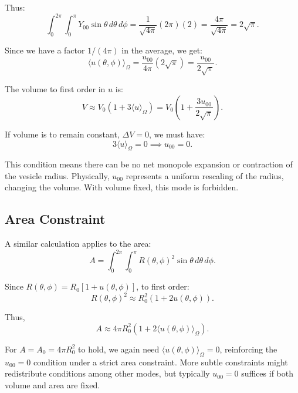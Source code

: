 \documentclass[12pt,a4paper]{article}
\begin{document}
Thus:
\begin{equation}
\int_0^{2\pi}\int_0^\pi Y_{00}\sin\theta\, d\theta\, d\phi = \frac{1}{\sqrt{4\pi}}(2\pi)(2) = \frac{4\pi}{\sqrt{4\pi}} = 2\sqrt{\pi}.
\end{equation}

Since we have a factor $1/(4\pi)$ in the average, we get:
\begin{equation}
\langle u(\theta,\phi)\rangle_{\Omega} = \frac{u_{00}}{4\pi}(2\sqrt{\pi}) = \frac{u_{00}}{2\sqrt{\pi}}.
\end{equation}

The volume to first order in $u$ is:
\begin{equation}
V \approx V_0(1 + 3 \langle u \rangle_{\Omega}) = V_0\left(1 + \frac{3u_{00}}{2\sqrt{\pi}}\right).
\end{equation}

If volume is to remain constant, $\Delta V=0$, we must have:
\begin{equation}
3 \langle u \rangle_{\Omega} = 0 \implies u_{00}=0.
\end{equation}

This condition means there can be no net monopole expansion or contraction of the vesicle radius. Physically, $u_{00}$ represents a uniform rescaling of the radius, changing the volume. With volume fixed, this mode is forbidden.

\subsection{Area Constraint}

A similar calculation applies to the area:
\begin{equation}
A = \int_0^{2\pi}\int_0^\pi R(\theta,\phi)^2 \sin\theta\, d\theta\, d\phi.
\end{equation}

Since $R(\theta,\phi)=R_0[1+u(\theta,\phi)]$, to first order:
\begin{equation}
R(\theta,\phi)^2 \approx R_0^2(1 + 2u(\theta,\phi)).
\end{equation}

Thus, 
\begin{equation}
A \approx 4\pi R_0^2 \left(1 + 2\langle u(\theta,\phi)\rangle_{\Omega}\right).
\end{equation}

For $A=A_0=4\pi R_0^2$ to hold, we again need $\langle u(\theta,\phi)\rangle_{\Omega}=0$, reinforcing the $u_{00}=0$ condition under a strict area constraint. More subtle constraints might redistribute conditions among other modes, but typically $u_{00}=0$ suffices if both volume and area are fixed.
\end{document}
